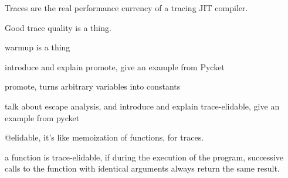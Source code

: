         \begin{paragraph-here}
            Traces are the real performance currency of a tracing JIT compiler.

            Good trace quality is a thing.
        \end{paragraph-here}

        \begin{paragraph-here}
            warmup is a thing
        \end{paragraph-here}

        \begin{paragraph-here}
            introduce and explain promote, give an example from Pycket

            promote, turns arbitrary variables into constants
        \end{paragraph-here}

        \begin{paragraph-here}
            talk about escape analysis, and introduce and explain trace-elidable, give an example from pycket

            @elidable, it's like memoization of functions, for traces.

            a function is trace-elidable, if during the execution of the program, successive calls to the function with identical arguments always return the same result.
        \end{paragraph-here}

